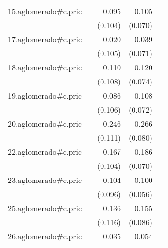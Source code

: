 {\begin{longtable}{l*{4}{D{.}{.}{-1}}}
\addlinespace
15.aglomerado#c.pric&                     &       0.095         &       0.105         &                     \\
            &                     &     (0.104)         &     (0.070)         &                     \\
\addlinespace
17.aglomerado#c.pric&                     &       0.020         &       0.039         &                     \\
            &                     &     (0.105)         &     (0.071)         &                     \\
\addlinespace
18.aglomerado#c.pric&                     &       0.110         &       0.120         &                     \\
            &                     &     (0.108)         &     (0.074)         &                     \\
\addlinespace
19.aglomerado#c.pric&                     &       0.086         &       0.108         &                     \\
            &                     &     (0.106)         &     (0.072)         &                     \\
\addlinespace
20.aglomerado#c.pric&                     &       0.246\sym{*}  &       0.266\sym{***}&                     \\
            &                     &     (0.111)         &     (0.080)         &                     \\
\addlinespace
22.aglomerado#c.pric&                     &       0.167         &       0.186\sym{**} &                     \\
            &                     &     (0.104)         &     (0.070)         &                     \\
\addlinespace
23.aglomerado#c.pric&                     &       0.104         &       0.100         &                     \\
            &                     &     (0.096)         &     (0.056)         &                     \\
\addlinespace
25.aglomerado#c.pric&                     &       0.136         &       0.155         &                     \\
            &                     &     (0.116)         &     (0.086)         &                     \\
\addlinespace
26.aglomerado#c.pric&                     &       0.035         &       0.054         &                     \\

\end{longtable}}
